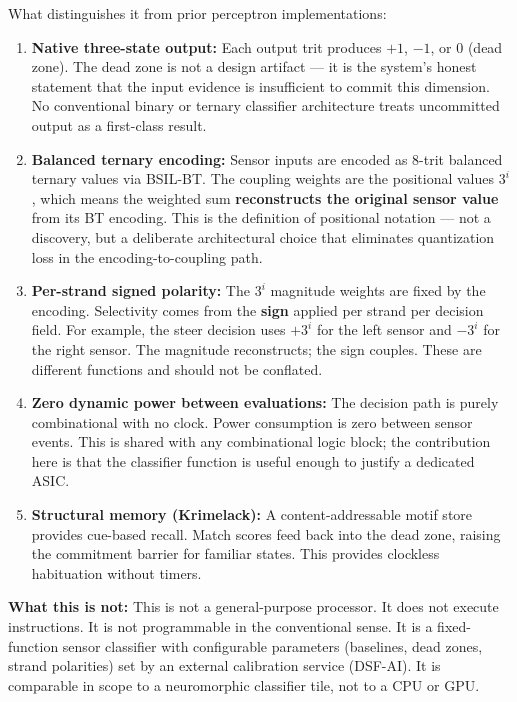 \documentclass[11pt, a4paper]{article}
\begin{document}
What distinguishes it from prior perceptron implementations:
\begin{enumerate}[nosep]
  \item \textbf{Native three-state output:} Each output trit
        produces $+1$, $-1$, or $0$ (dead zone). The dead zone
        is not a design artifact --- it is the system's honest
        statement that the input evidence is insufficient to
        commit this dimension. No conventional binary or ternary
        classifier architecture treats uncommitted output as a
        first-class result.
  \item \textbf{Balanced ternary encoding:} Sensor inputs are
        encoded as 8-trit balanced ternary values via BSIL-BT.
        The coupling weights are the positional values $3^i$,
        which means the weighted sum \textbf{reconstructs the
        original sensor value} from its BT encoding. This is
        the definition of positional notation --- not a discovery,
        but a deliberate architectural choice that eliminates
        quantization loss in the encoding-to-coupling path.
  \item \textbf{Per-strand signed polarity:} The $3^i$ magnitude
        weights are fixed by the encoding. Selectivity comes from
        the \textbf{sign} applied per strand per decision field.
        For example, the steer decision uses $+3^i$ for the left
        sensor and $-3^i$ for the right sensor. The magnitude
        reconstructs; the sign couples. These are different
        functions and should not be conflated.
  \item \textbf{Zero dynamic power between evaluations:} The
        decision path is purely combinational with no clock.
        Power consumption is zero between sensor events. This
        is shared with any combinational logic block; the
        contribution here is that the classifier function is
        useful enough to justify a dedicated ASIC.
  \item \textbf{Structural memory (Krimelack):} A content-addressable
        motif store provides cue-based recall. Match scores feed
        back into the dead zone, raising the commitment barrier
        for familiar states. This provides clockless habituation
        without timers.
\end{enumerate}

\textbf{What this is not:} This is not a general-purpose processor.
It does not execute instructions. It is not programmable in the
conventional sense. It is a fixed-function sensor classifier with
configurable parameters (baselines, dead zones, strand polarities)
set by an external calibration service (DSF-AI). It is comparable
in scope to a neuromorphic classifier tile, not to a CPU or GPU.
\end{document}

